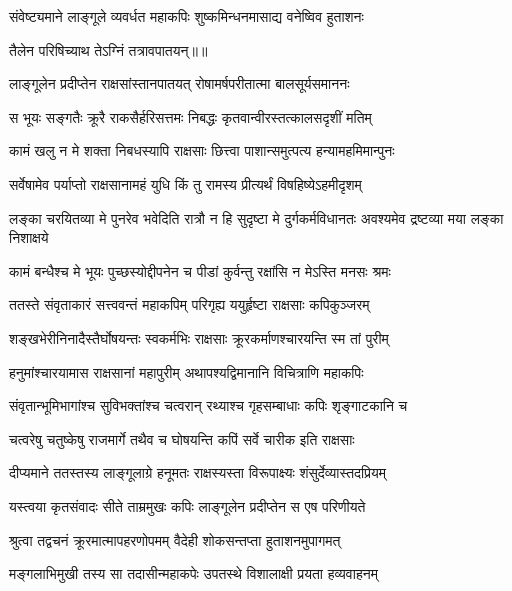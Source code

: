 \twolineshloka
{संवेष्ट्यमाने लाङ्गूले व्यवर्धत महाकपिः}
{शुष्कमिन्धनमासाद्य वनेष्विव हुताशनः} %

{तैलेन परिषिच्याथ तेऽग्निं तत्रावपातयन्॥॥} %

\addtocounter{shlokacount}{1}

\twolineshloka
{लाङ्गूलेन प्रदीप्तेन राक्षसांस्तानपातयत्}
{रोषामर्षपरीतात्मा बालसूर्यसमाननः} %

\twolineshloka
{स भूयः सङ्गतैः क्रूरै राकसैर्हरिसत्तमः}
{निबद्धः कृतवान्वीरस्तत्कालसदृशीं मतिम्} %

\twolineshloka
{कामं खलु न मे शक्ता निबधस्यापि राक्षसाः}
{छित्त्वा पाशान्समुत्पत्य हन्यामहमिमान्पुनः} %

\twolineshloka
{सर्वेषामेव पर्याप्तो राक्षसानामहं युधि}
{किं तु रामस्य प्रीत्यर्थं विषहिष्येऽहमीदृशम्} %

\threelineshloka
{लङ्का चरयितव्या मे पुनरेव भवेदिति}
{रात्रौ न हि सुदृष्टा मे दुर्गकर्मविधानतः}
{अवश्यमेव द्रष्टव्या मया लङ्का निशाक्षये} %

\twolineshloka
{कामं बन्धैश्च मे भूयः पुच्छस्योद्दीपनेन च}
{पीडां कुर्वन्तु रक्षांसि न मेऽस्ति मनसः श्रमः} %

\twolineshloka
{ततस्ते संवृताकारं सत्त्ववन्तं महाकपिम्}
{परिगृह्य ययुर्हृष्टा राक्षसाः कपिकुञ्जरम्} %

\twolineshloka
{शङ्खभेरीनिनादैस्तैर्घोषयन्तः स्वकर्मभिः}
{राक्षसाः क्रूरकर्माणश्चारयन्ति स्म तां पुरीम्} %

\twolineshloka
{हनुमांश्चारयामास राक्षसानां महापुरीम्}
{अथापश्यद्विमानानि विचित्राणि महाकपिः} %

\twolineshloka
{संवृतान्भूमिभागांश्च सुविभक्तांश्च चत्वरान्}
{रथ्याश्च गृहसम्बाधाः कपिः शृङ्गाटकानि च} %

\twolineshloka
{चत्वरेषु चतुष्केषु राजमार्गे तथैव च}
{घोषयन्ति कपिं सर्वे चारीक इति राक्षसाः} %

\twolineshloka
{दीप्यमाने ततस्तस्य लाङ्गूलाग्रे हनूमतः}
{राक्षस्यस्ता विरूपाक्ष्यः शंसुर्देव्यास्तदप्रियम्} %

\twolineshloka
{यस्त्वया कृतसंवादः सीते ताम्रमुखः कपिः}
{लाङ्गूलेन प्रदीप्तेन स एष परिणीयते} %

\twolineshloka
{श्रुत्वा तद्वचनं क्रूरमात्मापहरणोपमम्}
{वैदेही शोकसन्तप्ता हुताशनमुपागमत्} %

\twolineshloka
{मङ्गलाभिमुखी तस्य सा तदासीन्महाकपेः}
{उपतस्थे विशालाक्षी प्रयता हव्यवाहनम्} %

